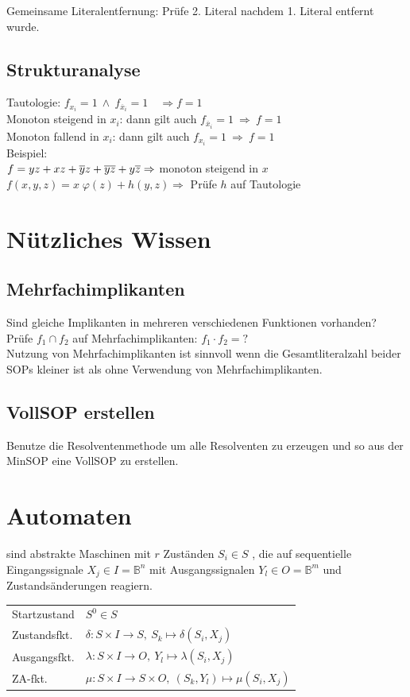 \documentclass[6pt,a4paper]{scrartcl}
\newcommand{\ol}[1]{\ensuremath{\overline{#1}}}									%
\newcommand{\Ra}[0]{\ensuremath{\Rightarrow}}									%
\newcommand{\n}[0]{\ensuremath{\overline}}										%
\begin{document}
\begin{multicols}{3}
Gemeinsame Literalentfernung: Prüfe 2. Literal nachdem 1. Literal entfernt wurde.\\

\subsection{Strukturanalyse}
Tautologie: $f_{x_i} = 1 \ \land \ f_{\overline x_i} = 1 \quad \Rightarrow f=1$\\
Monoton steigend in $x_i$:  dann gilt auch $f_{\ol x_i} = 1 \ \Ra\ f = 1$\\
Monoton fallend in $x_i$:  dann gilt auch $f_{x_i} = 1 \ \Ra\ f = 1$\\
Beispiel: \\
$f = yz + xz + \n y z + \n y \n z + y \n z \Ra$ monoton steigend in $x$ \\
$f(x,y,z) = x \; \varphi (z) + h(y,z) \Ra $ Prüfe $h$ auf Tautologie

\section{Nützliches Wissen}
\subsection{Mehrfachimplikanten}
Sind gleiche Implikanten in mehreren verschiedenen Funktionen vorhanden? \\ 
Prüfe  $f_1 \cap f_2 $ auf Mehrfachimplikanten: $f_1 \cdot f_2 = ?$ \\
Nutzung von Mehrfachimplikanten ist sinnvoll wenn die Gesamtliteralzahl beider SOPs kleiner ist als ohne Verwendung von Mehrfachimplikanten.

\subsection{VollSOP erstellen} %
\label{sub:VollSOP erstellen}
Benutze die Resolventenmethode um alle Resolventen zu erzeugen und so aus der MinSOP eine VollSOP zu erstellen.

\section{Automaten}
sind abstrakte Maschinen mit $r$ Zuständen $S_i \in S$ , die auf sequentielle Eingangssignale $X_j \in I = \mathbb B^n$ mit Ausgangssignalen $Y_l\in O = \mathbb B^m$ und Zustandsänderungen reagiern.\\
\begin{tabular}{ll}
	Startzustand & $S^0 \in S$ \\
	Zustandsfkt. & $\delta : S \times I \rightarrow S,\ S_k \mapsto \delta(S_i , X_j)$ \\
	Ausgangsfkt. & $\lambda : S \times I \rightarrow O,\ Y_l \mapsto \lambda(S_i , X_j)$ \\
	ZA-fkt. & $\mu : S \times I \rightarrow S \times O,\ (S_k, Y_l) \mapsto \mu(S_i , X_j)$ \\
\end{tabular}\\
\\

\end{multicols}
\end{document}
